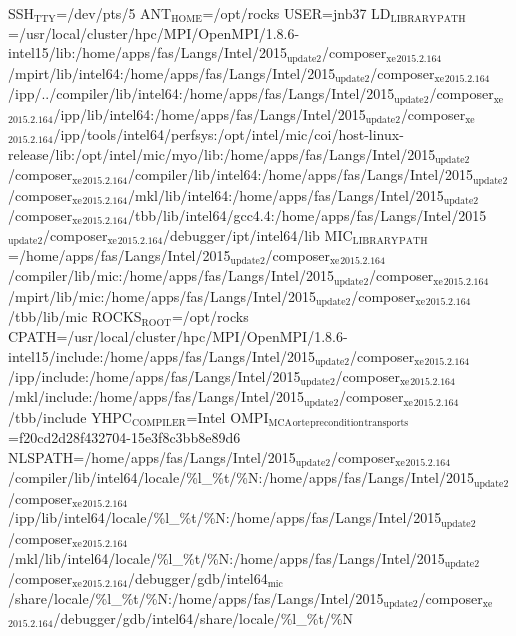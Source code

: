 \documentclass[11pt]{article}
\begin{document}
SSH\(_{\text{TTY}}\)=/dev/pts/5
ANT\(_{\text{HOME}}\)=/opt/rocks
USER=jnb37
LD\(_{\text{LIBRARY}}\)\(_{\text{PATH}}\)=/usr/local/cluster/hpc/MPI/OpenMPI/1.8.6-intel15/lib:/home/apps/fas/Langs/Intel/2015\(_{\text{update2}}\)/composer\(_{\text{xe}}\)\(_{\text{2015.2.164}}\)/mpirt/lib/intel64:/home/apps/fas/Langs/Intel/2015\(_{\text{update2}}\)/composer\(_{\text{xe}}\)\(_{\text{2015.2.164}}\)/ipp/../compiler/lib/intel64:/home/apps/fas/Langs/Intel/2015\(_{\text{update2}}\)/composer\(_{\text{xe}}\)\(_{\text{2015.2.164}}\)/ipp/lib/intel64:/home/apps/fas/Langs/Intel/2015\(_{\text{update2}}\)/composer\(_{\text{xe}}\)\(_{\text{2015.2.164}}\)/ipp/tools/intel64/perfsys:/opt/intel/mic/coi/host-linux-release/lib:/opt/intel/mic/myo/lib:/home/apps/fas/Langs/Intel/2015\(_{\text{update2}}\)/composer\(_{\text{xe}}\)\(_{\text{2015.2.164}}\)/compiler/lib/intel64:/home/apps/fas/Langs/Intel/2015\(_{\text{update2}}\)/composer\(_{\text{xe}}\)\(_{\text{2015.2.164}}\)/mkl/lib/intel64:/home/apps/fas/Langs/Intel/2015\(_{\text{update2}}\)/composer\(_{\text{xe}}\)\(_{\text{2015.2.164}}\)/tbb/lib/intel64/gcc4.4:/home/apps/fas/Langs/Intel/2015\(_{\text{update2}}\)/composer\(_{\text{xe}}\)\(_{\text{2015.2.164}}\)/debugger/ipt/intel64/lib
MIC\(_{\text{LIBRARY}}\)\(_{\text{PATH}}\)=/home/apps/fas/Langs/Intel/2015\(_{\text{update2}}\)/composer\(_{\text{xe}}\)\(_{\text{2015.2.164}}\)/compiler/lib/mic:/home/apps/fas/Langs/Intel/2015\(_{\text{update2}}\)/composer\(_{\text{xe}}\)\(_{\text{2015.2.164}}\)/mpirt/lib/mic:/home/apps/fas/Langs/Intel/2015\(_{\text{update2}}\)/composer\(_{\text{xe}}\)\(_{\text{2015.2.164}}\)/tbb/lib/mic
ROCKS\(_{\text{ROOT}}\)=/opt/rocks
CPATH=/usr/local/cluster/hpc/MPI/OpenMPI/1.8.6-intel15/include:/home/apps/fas/Langs/Intel/2015\(_{\text{update2}}\)/composer\(_{\text{xe}}\)\(_{\text{2015.2.164}}\)/ipp/include:/home/apps/fas/Langs/Intel/2015\(_{\text{update2}}\)/composer\(_{\text{xe}}\)\(_{\text{2015.2.164}}\)/mkl/include:/home/apps/fas/Langs/Intel/2015\(_{\text{update2}}\)/composer\(_{\text{xe}}\)\(_{\text{2015.2.164}}\)/tbb/include
YHPC\(_{\text{COMPILER}}\)=Intel
OMPI\(_{\text{MCA}}\)\(_{\text{orte}}\)\(_{\text{precondition}}\)\(_{\text{transports}}\)=f20cd2d28f432704-15e3f8c3bb8e89d6
NLSPATH=/home/apps/fas/Langs/Intel/2015\(_{\text{update2}}\)/composer\(_{\text{xe}}\)\(_{\text{2015.2.164}}\)/compiler/lib/intel64/locale/\%l\_\%t/\%N:/home/apps/fas/Langs/Intel/2015\(_{\text{update2}}\)/composer\(_{\text{xe}}\)\(_{\text{2015.2.164}}\)/ipp/lib/intel64/locale/\%l\_\%t/\%N:/home/apps/fas/Langs/Intel/2015\(_{\text{update2}}\)/composer\(_{\text{xe}}\)\(_{\text{2015.2.164}}\)/mkl/lib/intel64/locale/\%l\_\%t/\%N:/home/apps/fas/Langs/Intel/2015\(_{\text{update2}}\)/composer\(_{\text{xe}}\)\(_{\text{2015.2.164}}\)/debugger/gdb/intel64\(_{\text{mic}}\)/share/locale/\%l\_\%t/\%N:/home/apps/fas/Langs/Intel/2015\(_{\text{update2}}\)/composer\(_{\text{xe}}\)\(_{\text{2015.2.164}}\)/debugger/gdb/intel64/share/locale/\%l\_\%t/\%N
\end{document}
